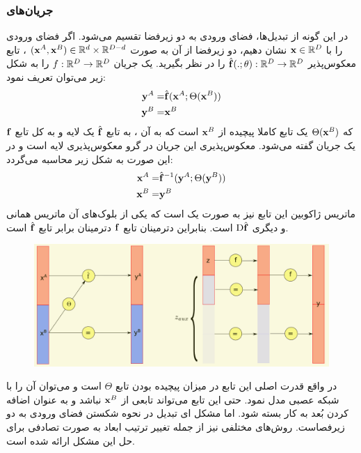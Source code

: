 \subsubsection{جریان‌های
}
در این گونه از تبدیل‌ها، فضای ورودی به دو زیرفضا تقسیم می‌شود. اگر فضای ورودی را با
${\bf x} \in {\mathbb{R}}^D$
نشان دهیم، دو زیرفضا از آن به صورت
$({\bf x}^A, {\bf x}^B) \in {\mathbb{R}}^d \times {\mathbb{R}}^{D - d}$
، تابع معکوس‌پذیر
$\hat{{\bf f}}(.; \theta) : {\mathbb{R}}^D \rightarrow {\mathbb{R}}^D$
را در نظر بگیرید. یک جریان \coupling{}
$f : {\mathbb{R}}^D \rightarrow {\mathbb{R}}^D$
را به شکل زیر می‌توان تعریف نمود:
\begin{align}
	{\bf y}^A = & \hat{{\bf f}} ({\bf x}^A; \Theta({\bf x}^B))
	\nonumber
	\\
	{\bf y}^B = & {\bf x}^B
\end{align}
که $\Theta({\bf x}^B)$ یک تابع کاملا پیچیده از ${\bf x}^B$ است که به آن
، به تابع $\hat{{\bf f}}$ یک لایه \coupling{} و به کل تابع ${\bf f}$ یک جریان \coupling{} گفته می‌شود. معکوس‌پذیری این جریان در گرو معکوس‌پذیری لایه \coupling{} است و در این صورت به شکل زیر محاسبه می‌گردد:
\begin{align}
	{\bf x}^A = & \hat{{\bf f}}^{-1} ({\bf y}^A; \Theta({\bf y}^B))
	\nonumber
	\\
	{\bf x}^B = & {\bf y}^B
\end{align}
ماتریس ژاکوبین این تابع نیز به صورت یک
است که یکی از بلوک‌های آن ماتریس همانی و دیگری $\text{D}\hat{{\bf f}}$ است. بنابراین دترمینان  تابع ${\bf f}$ دترمینان برابر تابع $\hat{{\bf f}}$ است.

\begin{figure}
	\centering
	\includegraphics[width=.5\textheight]{images/flow-survey1.png}
	\caption{
	}
\end{figure}

در واقع قدرت اصلی این تابع در میزان پیچیده بودن تابع $\Theta$ است و می‌توان آن را با شبکه عصبی مدل نمود. حتی این تابع می‌تواند تابعی از ${\bf x}^B$ نباشد و به عنوان اضافه کردن بُعد به کار بسته شود. اما مشکل ای تبدیل در نحوه شکستن فضای ورودی به دو زیرفصاست. روش‌های مختلفی نیز از جمله تغییر ترتیب ابعاد به صورت تصادفی برای حل این مشکل ارائه شده است.
